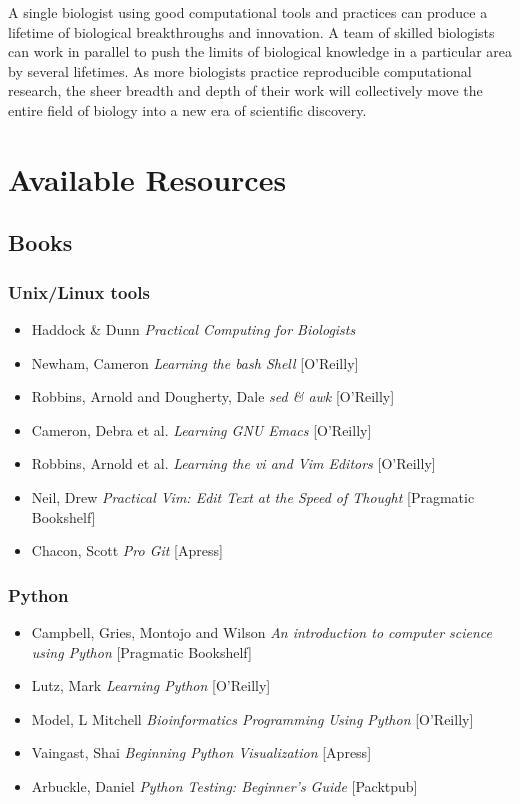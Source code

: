 \documentclass[ChapterTOCs,krantz2]{krantz} %
\begin{document}
A single biologist using good computational tools and
practices can produce a lifetime of biological breakthroughs and innovation.  A
team of skilled biologists can work in parallel to push the
limits of biological knowledge in a particular area by several lifetimes.  As
more biologists practice reproducible computational research, the sheer breadth
and depth of their work will collectively move the entire field of biology into
a new era of scientific discovery.

\section{Available Resources}
\subsection{Books}
\subsubsection{Unix/Linux tools}
\begin{itemize}
\item Haddock \& Dunn \emph{Practical Computing for Biologists}
\item Newham, Cameron \emph{Learning the bash Shell} [O'Reilly]
\item Robbins, Arnold and Dougherty, Dale \emph{sed \& awk} [O'Reilly]
\item Cameron, Debra et al. \emph{Learning GNU Emacs} [O'Reilly]
\item Robbins, Arnold et al. \emph{Learning the vi and Vim Editors} [O'Reilly]
\item Neil, Drew \emph{Practical Vim: Edit Text at the Speed of Thought} [Pragmatic Bookshelf]
\item Chacon, Scott \emph{Pro Git} [Apress]
\end{itemize}

\subsubsection{Python}
\begin{itemize}
\item Campbell, Gries, Montojo and Wilson \emph{An introduction to computer
science using Python} [Pragmatic Bookshelf]
\item Lutz, Mark \emph{Learning Python} [O'Reilly]
\item Model, L Mitchell \emph{Bioinformatics Programming Using Python} [O'Reilly]
\item Vaingast, Shai \emph{Beginning Python Visualization} [Apress]
\item Arbuckle, Daniel  \emph{Python Testing: Beginner’s Guide} [Packtpub]
\end{itemize}
\end{document}
